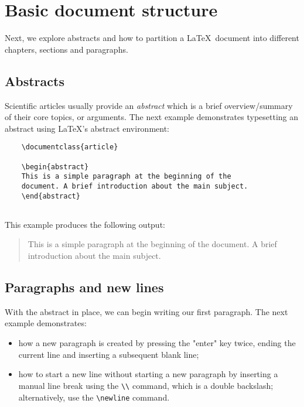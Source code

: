 \section{Basic document structure}

Next, we explore abstracts and how to partition a \LaTeX\ document into different chapters, sections and paragraphs.

\subsection{Abstracts}

Scientific articles usually provide an \emph{abstract} which is a brief overview/summary of their core topics, or arguments. The next example demonstrates typesetting an abstract using \LaTeX’s abstract environment:

\begin{tcolorbox}
\begin{verbatim}
    \documentclass{article}
    
    \begin{abstract}
    This is a simple paragraph at the beginning of the 
    document. A brief introduction about the main subject.
    \end{abstract}
    
\end{verbatim}
\end{tcolorbox}

This example produces the following output:

\begin{mdframed}
    \begin{abstract}
    This is a simple paragraph at the beginning of the document. A brief introduction about the main subject.
    \end{abstract}
\end{mdframed}

\subsection{Paragraphs and new lines}

With the abstract in place, we can begin writing our first paragraph. The next example demonstrates:

\begin{itemize}
    \item how a new paragraph is created by pressing the "enter" key twice, ending the current line and inserting a subsequent blank line;
    \item how to start a new line without starting a new paragraph by inserting a manual line break using the \verb|\\| command, which is a double backslash; alternatively, use the \verb|\newline| command.
\end{itemize}

